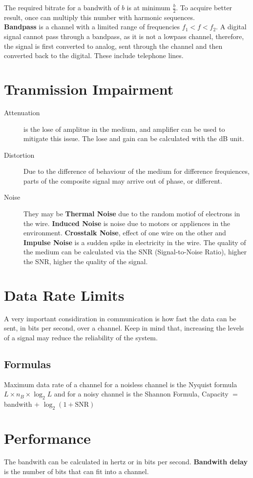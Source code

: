 \documentclass[11pt,a4paper,twoside]{book}
\begin{document}
The required bitrate for a bandwith of $b$ is at minimum $\frac{b}{2}$. To acquire better result, once can multiply this number with harmonic sequences.\\

\textbf{Bandpass} is a channel with a limited range of frequencies $f_1 < f < f_2$. A digital signal cannot pass through a bandpass, as it is not a lowpass channel, therefore, the signal is first converted to analog, sent through the channel and then converted back to the digital. These include telephone lines.\\

\section{Tranmission Impairment}

\begin{description}
\item[Attenuation] is the lose of amplitue in the medium, and amplifier can be used to mitigate this issue. The lose and gain can be calculated with the dB unit.
\item[Distortion] Due to the difference of behaviour of the medium for difference frequiences, parts of the composite signal may arrive out of phase, or different.\\
\item[Noise] They may be \textbf{Thermal  Noise} due to the random motiof of electrons in the wire. \textbf{Induced Noise} is noise due to motors or appliences in the environment. \textbf{Crosstalk Noise}, effect of one wire on the other and \textbf{Impulse Noise} is a sudden spike in electricity in the wire. The quality of the medium can be calculated via the SNR (Signal-to-Noise Ratio), higher the SNR, higher the quality of the signal.
\end{description}

\section{Data Rate Limits}

A very important considiration in communication is how fast the data can be sent, in bits per second, over a channel. Keep in mind that, increasing the levels of a signal may reduce the reliability of the system.

\subsection{Formulas}

Maximum data rate of a channel for a noisless channel is the Nyquist formula $L\times n_B \times \log_2 L$ \unsure and for a noisy channel is the Shannon Formula, Capacity $=$ bandwith $+$ $\log_2(1 + \text{SNR})$

\section{Performance}

The bandwith can be calculated in hertz or in bits per second. \textbf{Bandwith delay} is the number of bits that can fit into a channel.
\missed
\end{document}
